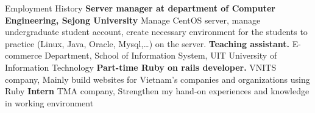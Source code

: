 \begin{rubric}{Employment History}
\entry*[02/2018 -- Present]%
	\textbf{Server manager at department of Computer Engineering, Sejong University} Manage CentOS server, manage undergraduate student account, create necessary environment for the students to practice (Linux, Java, Oracle, Mysql,…) on the server.
%
%
\entry*[06/2016 -- 03/2017]%
	\textbf{Teaching assistant.} E-commerce Department, School of Information System, \textsc{UIT} University of Information Technology
%
\entry*[04/2015 -- 01/2016]%
	\textbf{Part-time Ruby on rails developer.} VNITS company, Mainly build websites for Vietnam’s companies and organizations using Ruby
\entry*[07/2014 -- 10/2014]%
	\textbf{Intern} TMA company, Strengthen my hand-on experiences and knowledge in working environment
\end{rubric}